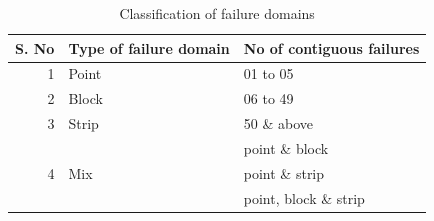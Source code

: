 \documentclass[runningheads,a4paper]{llncs}
\begin{document}
\begin{table}[h]
\scriptsize
\caption{Classification of failure domains} 
\centering
{\renewcommand{\arraystretch}{1.5}
\begin{tabular}{| r | l | l |} 
\hline 
S. No 	&	Type of failure domain						& No of contiguous failures	 \\
				  
				 
				 
				 
\hline 
1		&	Point										 & 01 to 05							\\
\hline 
2		& 	Block										 & 06 to 49							\\
\hline 
3		&	Strip 										 & 50 \& above						 \\ 
\hline 
		&				 								 & point \& block						\\
4		& 	Mix											 & point \& strip 						\\
		&											        & point, block \& strip				\\
\hline
\end{tabular}
}
\label{table:resultsSummary} %
\end{table}





\end{document}
